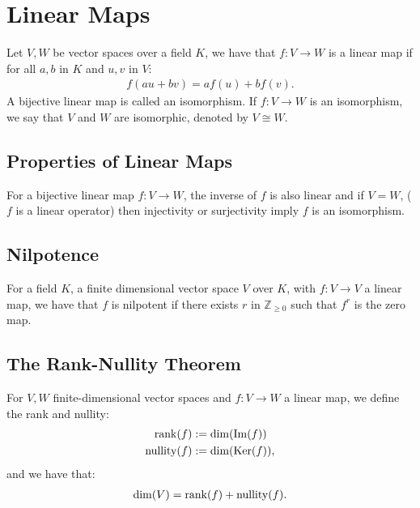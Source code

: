 \section{Linear Maps}

Let $V, W$ be vector spaces over a field $K$, we have that
$f:V \to W$ is a linear map if for all $a, b$ in $K$ and
$u, v$ in $V$: \begin{gather*}
  f(au+bv) = af(u) + bf(v).
\end{gather*} A bijective linear map is called an isomorphism.
If $f: V \to W$ is an isomorphism, we say that $V$ and $W$ are 
isomorphic, denoted by $V \cong W$. 

\subsection{Properties of Linear Maps}

For a bijective linear map $f : V \to W$, the inverse of $f$ is also linear
and if $V = W$, ($f$ is a linear operator) then injectivity or surjectivity 
imply $f$ is an isomorphism.

\subsection{Nilpotence}

For a field $K$, a finite dimensional vector space $V$ over $K$, 
with $f : V \to V$ a linear map, we have that $f$ is nilpotent 
if there exists $r$ in $\mathbb{Z}_{\geq 0}$ such that $f^r$ is the zero map.

\subsection{The Rank-Nullity Theorem}

For $V, W$ finite-dimensional vector spaces and 
$f : V \to W$ a linear map, we define the rank and nullity: \begin{align*}
    \operatorname{rank}(f) &:= \operatorname{dim}(\operatorname{Im}(f)) \\
    \operatorname{nullity}(f) &:= \operatorname{dim}(\operatorname{Ker}(f)),
\end{align*} and we have that:
\begin{gather*}
  \operatorname{dim}(V) = \operatorname{rank}(f) + \operatorname{nullity}(f).
\end{gather*}


